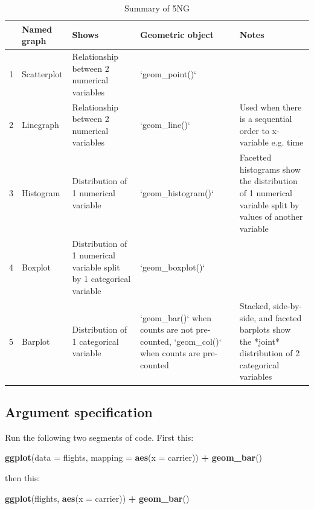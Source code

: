 \documentclass[12pt, krantz2,]{krantz}
\makeatletter
\newenvironment{Shaded}{\begin{snugshade}}{\end{snugshade}}
\newcommand{\DataTypeTok}[1]{\textcolor[rgb]{0.27,0.27,0.27}{#1}}
\newcommand{\KeywordTok}[1]{\textcolor[rgb]{0.27,0.27,0.27}{\textbf{#1}}}
\newcommand{\NormalTok}[1]{#1}
\newcommand{\OperatorTok}[1]{\textcolor[rgb]{0.43,0.43,0.43}{\textbf{#1}}}
\newcommand{\StringTok}[1]{\textcolor[rgb]{0.5,0.5,0.5}{#1}}
\newenvironment{kframe}{%
\medskip{}
\setlength{\fboxsep}{.8em}
 \def\at@end@of@kframe{}%
 \ifinner\ifhmode%
  \def\at@end@of@kframe{\end{minipage}}%
  \begin{minipage}{\columnwidth}%
 \fi\fi%
 \def\FrameCommand##1{\hskip\@totalleftmargin \hskip-\fboxsep
 \colorbox{shadecolor}{##1}\hskip-\fboxsep
     \hskip-\linewidth \hskip-\@totalleftmargin \hskip\columnwidth}%
 \MakeFramed {\advance\hsize-\width
   \@totalleftmargin\z@ \linewidth\hsize
   \@setminipage}}%
 {\par\unskip\endMakeFramed%
 \at@end@of@kframe}
\renewenvironment{Shaded}{\begin{kframe}}{\end{kframe}}
\makeatother
\begin{document}
\begin{table}[H]

\caption{\label{tab:viz-summary-table}Summary of 5NG}
\centering
\fontsize{10}{12}\selectfont
\begin{tabular}{rl>{\raggedright\arraybackslash}p{0.75in}>{\raggedright\arraybackslash}p{1.1in}>{\raggedright\arraybackslash}p{1.1in}}
\toprule
  & Named graph & Shows & Geometric object & Notes\\
\midrule
1 & Scatterplot & Relationship between 2 numerical variables & `geom\_point()` & \\
2 & Linegraph & Relationship between 2 numerical variables & `geom\_line()` & Used when there is a sequential order to x-variable e.g. time\\
3 & Histogram & Distribution of 1 numerical variable & `geom\_histogram()` & Facetted histograms show the distribution of 1 numerical variable split by values of another variable\\
4 & Boxplot & Distribution of 1 numerical variable split by 1 categorical variable & `geom\_boxplot()` & \\
5 & Barplot & Distribution of 1 categorical variable & `geom\_bar()` when counts are not pre-counted, `geom\_col()` when counts are pre-counted & Stacked, side-by-side, and faceted barplots show the *joint* distribution of 2 categorical variables\\
\bottomrule
\end{tabular}
\end{table}

\hypertarget{argument-specification}{%
\subsection{Argument specification}\label{argument-specification}}

Run the following two segments of code. First this:

\begin{Shaded}
\begin{Highlighting}[]
\KeywordTok{ggplot}\NormalTok{(}\DataTypeTok{data =}\NormalTok{ flights, }\DataTypeTok{mapping =} \KeywordTok{aes}\NormalTok{(}\DataTypeTok{x =}\NormalTok{ carrier)) }\OperatorTok{+}
\StringTok{  }\KeywordTok{geom_bar}\NormalTok{()}
\end{Highlighting}
\end{Shaded}

then this:

\begin{Shaded}
\begin{Highlighting}[]
\KeywordTok{ggplot}\NormalTok{(flights, }\KeywordTok{aes}\NormalTok{(}\DataTypeTok{x =}\NormalTok{ carrier)) }\OperatorTok{+}
\StringTok{  }\KeywordTok{geom_bar}\NormalTok{()}
\end{Highlighting}
\end{Shaded}
\end{document}
